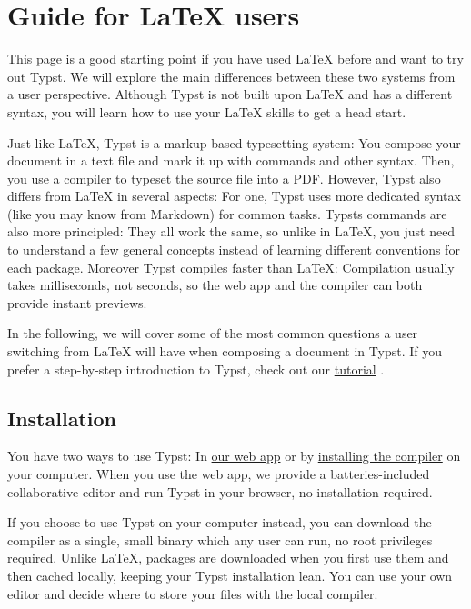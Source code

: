\section{Guide for LaTeX users}\label{guide-for-latex-users}

This page is a good starting point if you have used LaTeX before and
want to try out Typst. We will explore the main differences between
these two systems from a user perspective. Although Typst is not built
upon LaTeX and has a different syntax, you will learn how to use your
LaTeX skills to get a head start.

Just like LaTeX, Typst is a markup-based typesetting system: You compose
your document in a text file and mark it up with commands and other
syntax. Then, you use a compiler to typeset the source file into a PDF.
However, Typst also differs from LaTeX in several aspects: For one,
Typst uses more dedicated syntax (like you may know from Markdown) for
common tasks. Typst\textquotesingle s commands are also more principled:
They all work the same, so unlike in LaTeX, you just need to understand
a few general concepts instead of learning different conventions for
each package. Moreover Typst compiles faster than LaTeX: Compilation
usually takes milliseconds, not seconds, so the web app and the compiler
can both provide instant previews.

In the following, we will cover some of the most common questions a user
switching from LaTeX will have when composing a document in Typst. If
you prefer a step-by-step introduction to Typst, check out our
\href{/docs/tutorial/}{tutorial} .

\subsection{Installation}\label{installation}

You have two ways to use Typst: In \href{https://typst.app/signup/}{our
web app} or by \href{https://github.com/typst/typst/releases}{installing
the compiler} on your computer. When you use the web app, we provide a
batteries-included collaborative editor and run Typst in your browser,
no installation required.

If you choose to use Typst on your computer instead, you can download
the compiler as a single, small binary which any user can run, no root
privileges required. Unlike LaTeX, packages are downloaded when you
first use them and then cached locally, keeping your Typst installation
lean. You can use your own editor and decide where to store your files
with the local compiler.

